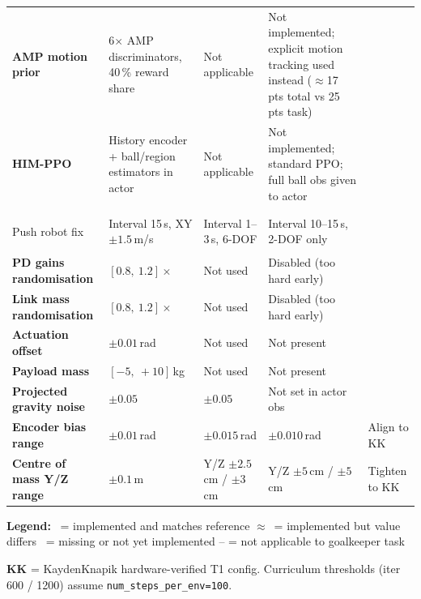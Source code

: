 \documentclass[a4paper,10pt]{article}
\newcommand{\cmark}{\ding{51}}   %
\newcommand{\xmark}{\ding{55}}   %
\newcommand{\wmark}{$\approx$}   %
\begin{document}
{\begin{longtable}{>{\bfseries}p{3.6cm} p{3.4cm} p{3.4cm} p{3.4cm} p{1.2cm}}
AMP motion prior
  & 6$\times$ AMP discriminators, 40\,\% reward share
  & Not applicable
  & Not implemented; explicit motion tracking used instead ($\approx$17 pts total vs 25 pts task)
  & \xmark \\

HIM-PPO
  & History encoder + ball/region estimators in actor
  & Not applicable
  & Not implemented; standard PPO; full ball obs given to actor
  & \xmark \\

\midrule
\rowcolor{sectionbg}
\multicolumn{5}{l}{\textcolor{white}{\textbf{Still to implement (DR / sim2real gaps)}}} \\
\midrule

Push robot fix
  & Interval 15\,s, XY $\pm1.5$\,m/s
  & Interval 1--3\,s, 6-DOF
  & Interval 10--15\,s, 2-DOF only
  & \xmark \\

PD gains randomisation
  & $[0.8,\ 1.2]\times$
  & Not used
  & Disabled (too hard early)
  & \xmark \\

Link mass randomisation
  & $[0.8,\ 1.2]\times$
  & Not used
  & Disabled (too hard early)
  & \xmark \\

Actuation offset
  & $\pm0.01$\,rad
  & Not used
  & Not present
  & \xmark \\

Payload mass
  & $[-5,\ +10]$\,kg
  & Not used
  & Not present
  & \xmark \\

Projected gravity noise
  & $\pm0.05$
  & $\pm0.05$
  & Not set in actor obs
  & \xmark \\

Encoder bias range
  & $\pm0.01$\,rad
  & $\pm0.015$\,rad
  & $\pm0.010$\,rad
  & Align to KK \\

Centre of mass Y/Z range
  & $\pm0.1$\,m
  & Y/Z $\pm2.5$\,cm / $\pm3$\,cm
  & Y/Z $\pm5$\,cm / $\pm5$\,cm
  & Tighten to KK \\

\bottomrule
\end{longtable}
}

\vspace{6pt}
{\footnotesize
\textbf{Legend:}
\cmark\ = implemented and matches reference \quad
\wmark\ = implemented but value differs \quad
\xmark\ = missing or not yet implemented \quad
-- = not applicable to goalkeeper task
}

\vspace{4pt}
{\footnotesize
\textbf{KK} = KaydenKnapik hardware-verified T1 config.
Curriculum thresholds (iter 600 / 1200) assume \texttt{num\_steps\_per\_env=100}.
}
\end{document}
